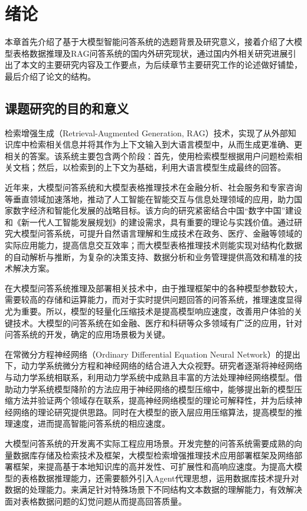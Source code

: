 \chapter{绪论}
\label{cha:intro}

本章首先介绍了基于大模型智能问答系统的选题背景及研究意义，接着介绍了大模型表格数据推理及RAG问答系统的国内外研究现状，通过国内外相关研究进展引出了本文的主要研究内容及工作要点，为后续章节主要研究工作的论述做好铺垫，最后介绍了论文的结构。
 
\section{课题研究的目的和意义}
检索增强生成（Retrieval-Augmented Generation, RAG）技术，实现了从外部知识库中检索相关信息并将其作为上下文输入到大语言模型中，从而生成更准确、更相关的答案。该系统主要包含两个阶段：首先，使用检索模型根据用户问题检索相关文档；然后，以检索到的上下文为基础，利用大语言模型生成最终的回答。

近年来，大模型问答系统和大模型表格推理技术在金融分析、社会服务和专家咨询等垂直领域加速落地，推动了人工智能在智能交互与信息处理领域的应用，助力国家数字经济和智能化发展的战略目标。该方向的研究紧密结合中国“数字中国”建设和《新一代人工智能发展规划》的建设需求，具有重要的理论与实践价值。通过研究大模型问答系统，可提升自然语言理解和生成技术在政务、医疗、金融等领域的实际应用能力，提高信息交互效率；而大模型表格推理技术则能实现对结构化数据的自动解析与推断，为复杂的决策支持、数据分析和业务管理提供高效和精准的技术解决方案。

在大模型问答系统推理及部署相关技术中，由于推理框架中的各种模型参数较大，需要较高的存储和运算能力，而对于实时提供问题回答的问答系统，推理速度显得尤为重要。所以，模型的轻量化压缩技术是提高模型响应速度，改善用户体验的关键技术。大模型的问答系统在如金融、医疗和科研等众多领域有广泛的应用\cite{1024008988.nh,1024073638.nh,1024579116.nh,1024744443.nh,1024508435.nh}，针对问答系统的开发，确定的应用场景极为关键。

在常微分方程神经网络（Ordinary Differential Equation Neural Network）\cite{chen2018neural}的提出下，动力学系统微分方程和神经网络的结合进入大众视野。研究者逐渐将神经网络与动力学系统相联系，利用动力学系统中成熟且丰富的方法处理神经网络模型。借助动力学系统模型降阶的方法应用于神经网络的模型压缩中，能够提出新的模型压缩方法并验证两个领域存在联系，提高神经网络模型的理论可解释性，并为后续神经网络的理论研究提供思路。同时在大模型的嵌入层应用压缩算法，提高模型的推理速度，进而提高智能问答系统的相应速度。

大模型问答系统的开发离不实际工程应用场景。开发完整的问答系统需要成熟的向量数据库存储及检索技术及框架，大模型检索增强推理技术应用部署框架及网络部署框架，来提高基于本地知识库的高并发性、可扩展性和高响应速度。为提高大模型的表格数据推理能力，还需要额外引入Agent代理思想，运用数据库技术提升对数据的处理能力。来满足针对特殊场景下不同结构文本数据的理解能力，有效解决面对表格数据问题的幻觉问题从而提高回答质量。

